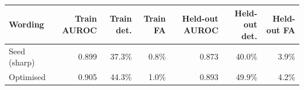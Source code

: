 \begin{tabular}{@{}lrrrrrr@{}}
\toprule
Wording & Train AUROC & Train det. & Train FA & Held-out AUROC & Held-out det. & Held-out FA \\
\midrule
Seed (sharp) & 0.899 & 37.3\% & 0.8\% & 0.873 & 40.0\% & 3.9\% \\
Optimised & 0.905 & 44.3\% & 1.0\% & 0.893 & 49.9\% & 4.2\% \\
\bottomrule
\end{tabular}
